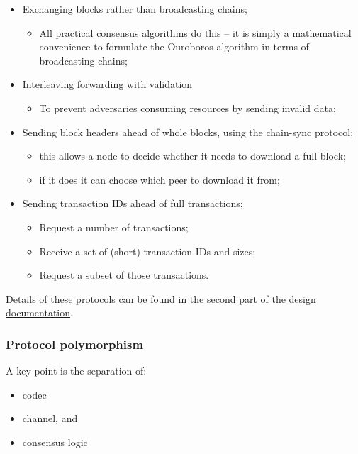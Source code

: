 \documentclass[11pt,a4paper]{article}
\begin{document}
\begin{itemize}
\item
  Exchanging blocks rather than broadcasting chains;

  \begin{itemize}
  \item
    All practical consensus algorithms do this -- it is simply a
    mathematical convenience to formulate the Ouroboros algorithm in
    terms of broadcasting chains;
  \end{itemize}
\item
  Interleaving forwarding with validation

  \begin{itemize}
  \item
    To prevent adversaries consuming resources by sending invalid data;
  \end{itemize}
\item
  Sending block headers ahead of whole blocks, using the chain-sync
  protocol;

  \begin{itemize}
  \item
    this allows a node to decide whether it needs to download a full
    block;
  \item
    if it does it can choose which peer to download it from;
  \end{itemize}
\item
  Sending transaction IDs ahead of full transactions;

  \begin{itemize}
  \item
    Request a number of transactions;
  \item
    Receive a set of (short) transaction IDs and sizes;
  \item
    Request a subset of those transactions.
  \end{itemize}
\end{itemize}

Details of these protocols can be found in the
\href{https://hydra.iohk.io/build/1011577/download/1/network.pdf}{{second
part of the design documentation}}.

\subsubsection{Protocol polymorphism}
\label{protocol-polymorphism}

A key point is the separation of:

\begin{itemize}
\item
  codec
\item
  channel, and
\item
  consensus logic
\end{itemize}
\end{document}
